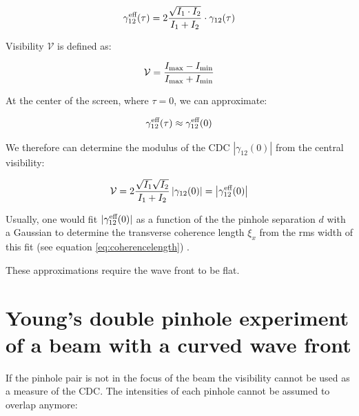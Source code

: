 \documentclass{osa-article}
\begin{document}
\begin{equation}
    \gamma_{12}^{\textup{eff}}(\tau) = 2 \frac{\sqrt{I_1 \cdot I_2}}{I_1 + I_2} \cdot \gamma_{12}(\tau)
\end{equation}

Visibility $ \mathcal{V} $ is defined as:

\begin{equation}
    \mathcal{V} = \frac{I_\textup{max}-I_\textup{min}}{I_\textup{max}+I_\textup{min}}
\end{equation}

At the center of the screen, where $ \tau = 0 $, we can approximate:

\begin{equation}
    \gamma_{12}^{\textup{eff}}(\tau) \approx \gamma_{12}^{\textup{eff}}(0)
\end{equation}

We therefore can determine the modulus of the CDC $ \left| \gamma_{12}(0) \right|$ from the central visibility:

\begin{equation}
    \mathcal{V} = 2 \frac{\sqrt{I_1} \sqrt{I_2}}{I_1 + I_2} \left| \gamma_{12}(0) \right| = \left| \gamma_{12}^{\textup{eff}}(0) \right|
\end{equation}

Usually, one would fit $|\gamma_{12}^{\textup{eff}}(0)|$ as a function of the the pinhole separation $d$ with a Gaussian to determine the transverse coherence length $\xi_x$ from the rms width of this fit (see equation \ref{eq:coherencelength}) \cite[fig.4]{SingerSorgenfreiMancusoEtAl2012}.


These approximations require the wave front to be flat.

\section{Young's double pinhole experiment of a beam with a curved wave front}

If the pinhole pair is not in the focus of the beam the visibility cannot be used as a measure of the CDC. The intensities of each pinhole cannot be assumed to overlap anymore:
\end{document}

